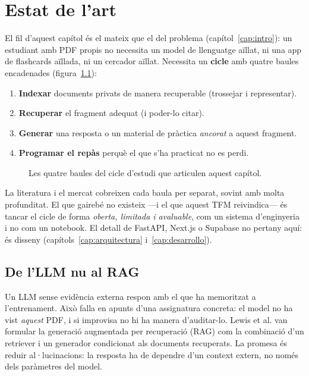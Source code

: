 \chapter{Estat de l'art}
\label{cap:arte}

El fil d'aquest capítol és el mateix que el del problema (capítol~\ref{cap:intro}): un estudiant amb PDF propis no necessita un model de llenguatge aïllat, ni una app de flashcards aïllada, ni un cercador aïllat. Necessita un \textbf{cicle} amb quatre baules encadenades (figura~\ref{fig:cicle}):

\begin{enumerate}
  \item \textbf{Indexar} documents privats de manera recuperable (trossejar i representar).
  \item \textbf{Recuperar} el fragment adequat (i poder-lo citar).
  \item \textbf{Generar} una resposta o un material de pràctica \emph{ancorat} a aquest fragment.
  \item \textbf{Programar el repàs} perquè el que s'ha practicat no es perdi.
\end{enumerate}

\begin{figure}[htbp]
\centering

\caption{Les quatre baules del cicle d'estudi que articulen aquest capítol.}
\label{fig:cicle}
\end{figure}

La literatura i el mercat cobreixen cada baula per separat, sovint amb molta profunditat. El que gairebé no existeix ---i el que aquest TFM reivindica--- és tancar el cicle de forma \emph{oberta, limitada i avaluable}, com un sistema d'enginyeria i no com un notebook. El detall de FastAPI, Next.js o Supabase no pertany aquí: és disseny (capítols~\ref{cap:arquitectura} i~\ref{cap:desarrollo}).

\section{De l'LLM nu al RAG}

Un LLM sense evidència externa respon amb el que ha memoritzat a l'entrenament. Això falla en apunts d'una assignatura concreta: el model no ha vist \emph{aquest} PDF, i si improvisa no hi ha manera d'auditar-lo. Lewis et al. \parencite{lewis2020rag} van formular la generació augmentada per recuperació (RAG) com la combinació d'un retriever i un generador condicionat als documents recuperats. La promesa és reduir al·lucinacions: la resposta ha de dependre d'un context extern, no només dels paràmetres del model.

